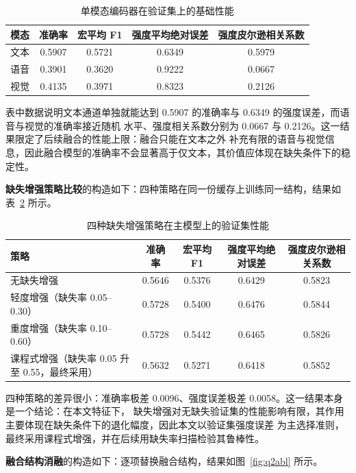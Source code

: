 \documentclass[bwprint]{gmcmthesis}
\begin{document}
\begin{table}[htp!]
\centering
\caption{单模态编码器在验证集上的基础性能}
\label{tab:encoder}
\renewcommand\arraystretch{1.25}
\begin{tabular}{|c|c|c|c|c|}
\hline
模态 & 准确率 & 宏平均 F1 & 强度平均绝对误差 & 强度皮尔逊相关系数 \\
\hline
文本 & 0.5907 & 0.5721 & 0.6349 & 0.5979 \\
\hline
语音 & 0.3901 & 0.3620 & 0.9222 & 0.0667 \\
\hline
视觉 & 0.4135 & 0.3971 & 0.8323 & 0.2126 \\
\hline
\end{tabular}
\end{table}

表中数据说明文本通道单独就能达到 0.5907 的准确率与 0.6349 的强度误差，而语音与视觉的准确率接近随机
水平、强度相关系数分别为 0.0667 与 0.2126。这一结果限定了后续融合的性能上限：融合只能在文本之外
补充有限的语音与视觉信息，因此融合模型的准确率不会显著高于仅文本，其价值应体现在缺失条件下的稳定性。

\textbf{缺失增强策略比较}的构造如下：四种策略在同一份缓存上训练同一结构，结果如表~\ref{tab:strategy} 所示。

\begin{table}[htp!]
\centering
\caption{四种缺失增强策略在主模型上的验证集性能}
\label{tab:strategy}
\renewcommand\arraystretch{1.2}
\small
\setlength{\tabcolsep}{4pt}
\begin{tabular}{|p{3.6cm}|c|c|c|c|}
\hline
策略 & 准确率 & 宏平均 F1 & 强度平均绝对误差 & 强度皮尔逊相关系数 \\
\hline
无缺失增强 & 0.5646 & 0.5376 & 0.6429 & 0.5823 \\
\hline
轻度增强（缺失率 0.05--0.30） & 0.5728 & 0.5400 & 0.6476 & 0.5844 \\
\hline
重度增强（缺失率 0.10--0.60） & 0.5728 & 0.5442 & 0.6465 & 0.5826 \\
\hline
课程式增强（缺失率 0.05 升至 0.55，最终采用） & 0.5632 & 0.5271 & 0.6418 & 0.5852 \\
\hline
\end{tabular}
\end{table}

四种策略的差异很小：准确率极差 0.0096、强度误差极差 0.0058。这一结果本身是一个结论：在本文特征下，
缺失增强对无缺失验证集的性能影响有限，其作用主要体现在缺失条件下的退化幅度，因此本文以验证集强度误差
为主选择准则，最终采用课程式增强，并在后续用缺失率扫描检验其鲁棒性。

\textbf{融合结构消融}的构造如下：逐项替换融合结构，结果如图~\ref{fig:q2abl} 所示。
\end{document}
